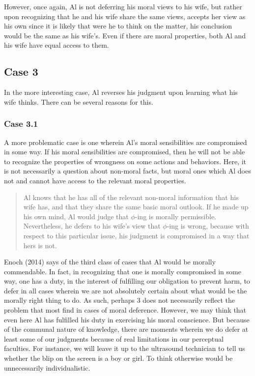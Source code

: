 \documentclass[12pt]{book}
\theoremstyle{definition}
\theoremstyle{remark}
\begin{document}
However, once again, Al is not deferring his moral views to his wife, but rather upon recognizing that he and his wife share the same views, accepts her view as his own since it is likely that were he to think on the matter, his conclusion would be the same as his wife's. Even if there are moral properties, both Al and his wife have equal access to them.

\subsection*{Case 3}\label{case-3}

In the more interesting case, Al reverses his judgment upon learning what his wife thinks. There can be several reasons for this.

\subsubsection*{Case 3.1}\label{case-3.1}

A more problematic case is one wherein Al's moral sensibilities are compromised in some way. If his moral sensibilities are compromised, then he will not be able to recognize the properties of wrongness on some actions and behaviors. Here, it is not necessarily a question about non-moral facts, but moral ones which Al does not and cannot have access to the relevant moral properties.

\begin{quote}
Al knows that he has all of the relevant non-moral information that his wife has, and that they share the same basic moral outlook. If he made up his own mind, Al would judge that \(\phi\)-ing is morally permissible. Nevertheless, he defers to his wife's view that \(\phi\)-ing is wrong, because with respect to this particular issue, his judgment is compromised in a way that hers is not.
\end{quote}

Enoch (2014) says of the third class of cases that Al would be morally commendable. In fact, in recognizing that one is morally compromised in some way, one has a duty, in the interest of fulfilling our obligation to prevent harm, to defer in all cases wherein we are not absolutely certain about what would be the morally right thing to do. As such, perhaps 3 does not necessarily reflect the problem that most find in cases of moral deference. However, we may think that even here Al has fulfilled his duty in exercising his moral conscience. But because of the communal nature of knowledge, there are moments wherein we do defer at least some of our judgments because of real limitations in our perceptual faculties. For instance, we will leave it up to the ultrasound technician to tell us whether the blip on the screen is a boy or girl. To think otherwise would be unnecessarily individualistic.
\end{document}
